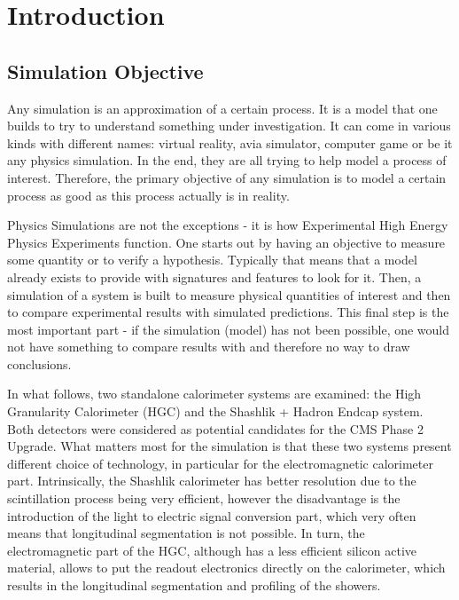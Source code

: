 \section{Introduction} \label{section:simulations_introduction}

\subsection{Simulation Objective} \label{subsection:simulations_introduction_objective}
Any simulation is an approximation of a certain process. It is a model that one builds to try to understand something under investigation. It can come in various kinds with different names: virtual reality, avia simulator, computer game or be it any physics simulation. In the end, they are all trying to help model a process of interest. Therefore, the primary objective of any simulation is to model a certain process as good as this process actually is in reality.

Physics Simulations are not the exceptions - it is how Experimental High Energy Physics Experiments function. One starts out by having an objective to measure some quantity or to verify a hypothesis. Typically that means that a model already exists to provide with signatures and features to look for it. Then, a simulation of a system is built to measure physical quantities of interest and then to compare experimental results with simulated predictions. This final step is the most important part - if the simulation (model) has not been possible, one would not have something to compare results with and therefore no way to draw conclusions.

In what follows, two standalone calorimeter systems are examined: the High Granularity Calorimeter (HGC) \cite{Magnan:2017exp} and the Shashlik + Hadron Endcap system. Both detectors were considered as potential candidates for the CMS Phase 2 Upgrade. What matters most for the simulation is that these two systems present different choice of technology, in particular for the electromagnetic calorimeter part. Intrinsically, the Shashlik calorimeter has better resolution due to the scintillation process being very efficient, however the disadvantage is the introduction of the light to electric signal conversion part, which very often means that longitudinal segmentation is not possible. In turn, the electromagnetic part of the HGC, although has a less efficient silicon active material, allows to put the readout electronics directly on the calorimeter, which results in the longitudinal segmentation and profiling of the showers.

